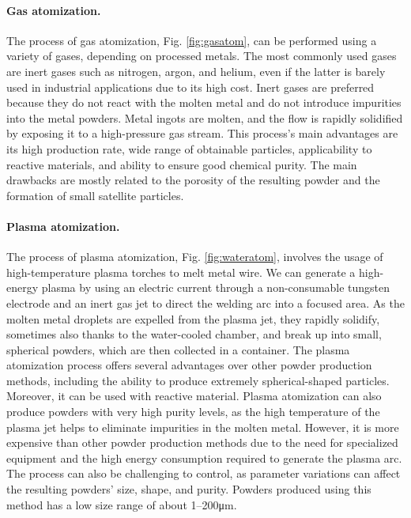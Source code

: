 \paragraph{Gas atomization.} The process of gas atomization, Fig. \ref{fig:gasatom}, can be performed using a variety of gases, depending on processed metals. The most commonly used gases are inert gases such as nitrogen, argon, and helium, even if the latter is barely used in industrial applications due to its high cost. Inert gases are preferred because they do not react with the molten metal and do not introduce impurities into the metal powders. Metal ingots are molten, and the flow is rapidly solidified by exposing it to a high-pressure gas stream. This process's main advantages are its high production rate, wide range of obtainable particles, applicability to reactive materials, and ability to ensure good chemical purity. The main drawbacks are mostly related to the porosity of the resulting powder and the formation of small satellite particles.

\paragraph{Plasma atomization.} The process of plasma atomization, Fig. \ref{fig:wateratom}, involves the usage of high-temperature plasma torches to melt metal wire. We can generate a high-energy plasma by using an electric current through a non-consumable tungsten electrode and an inert gas jet to direct the welding arc into a focused area. As the molten metal droplets are expelled from the plasma jet, they rapidly solidify, sometimes also thanks to the water-cooled chamber, and break up into small, spherical powders, which are then collected in a container. The plasma atomization process offers several advantages over other powder production methods, including the ability to produce extremely spherical-shaped particles. Moreover, it can be used with reactive material. Plasma atomization can also produce powders with very high purity levels, as the high temperature of the plasma jet helps to eliminate impurities in the molten metal. However, it is more expensive than other powder production methods due to the need for specialized equipment and the high energy consumption required to generate the plasma arc. The process can also be challenging to control, as parameter variations can affect the resulting powders' size, shape, and purity. Powders produced using this method has a low size range of about \numrange[range-phrase = --]{1}{200}\unit{\micro\metre}.
